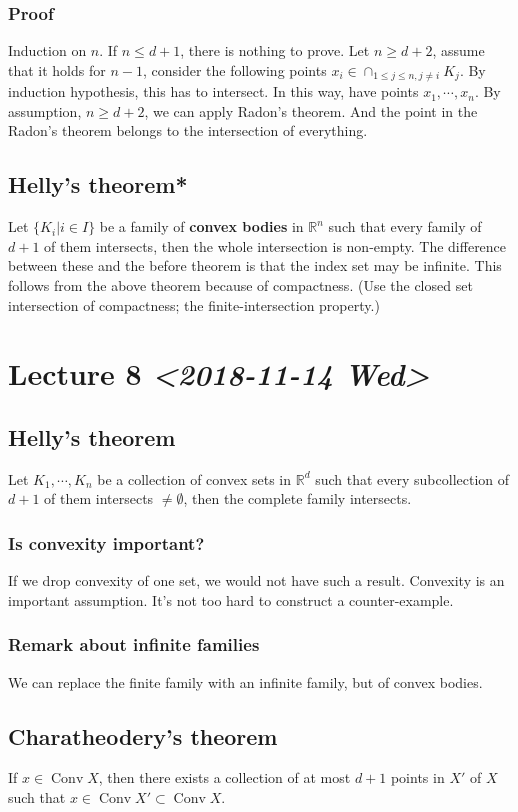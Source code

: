 \documentclass[11pt]{article}
\def\R{\mathbb{R}}
\def\conv{\operatorname{Conv}}
\begin{document}
\subsubsection{Proof}
\label{sec:org5c4d94c}
Induction on \(n\). If \(n \le d+1\), there is nothing to prove. Let \(n \ge
    d+2\), assume that it holds for \(n-1\), consider the following points \(x_i \in
    \cap_{1 \le j \le n, j \neq i} K_j\). By induction hypothesis, this has to
intersect. In this way, have points \(x_1, \cdots, x_n\). By assumption, \(n\ge
    d+2\), we can apply Radon's theorem. And the point in the Radon's theorem
belongs to the intersection of everything.
\subsection{Helly's theorem*}
\label{sec:org5add388}
Let \(\{K_i \vert i \in I\}\) be a family of \textbf{convex bodies} in \(\R^n\) such
that every family of \(d+1\) of them intersects, then the whole intersection is
non-empty. The difference between these and the before theorem is that the
index set may be infinite. This follows from the above theorem because of
compactness. (Use the closed set intersection of compactness; the
finite-intersection property.)
\section{Lecture 8 \textit{<2018-11-14 Wed>}}
\label{sec:org6b8c98f}
\subsection{Helly's theorem}
\label{sec:org7c36d4c}
Let \(K_1, \cdots, K_n\) be a collection of convex sets in \(\R^d\) such that
every subcollection of \(d+1\) of them intersects \(\neq \emptyset\), then the
complete family intersects.
\subsubsection{Is convexity important?}
\label{sec:org9f93c72}
If we drop convexity of one set, we would not have such a result. Convexity
is an important assumption. It's not too hard to construct a
counter-example.
\subsubsection{Remark about infinite families}
\label{sec:orgfeefc8b}
We can replace the finite family with an infinite family, but of convex
bodies.
\subsection{Charatheodery's theorem}
\label{sec:org105c54d}
If \(x\in \conv X\), then there exists a collection of at most \(d+1\) points in
\(X'\) of \(X\) such that \(x\in \conv X' \subset \conv X\).
\end{document}
